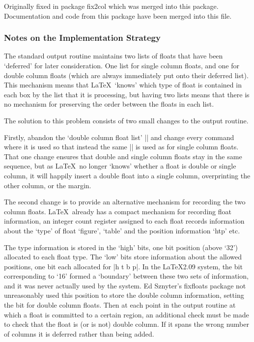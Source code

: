 \documentclass{ltxguide}
\newcommand\Lpack[1]{\mbox{\textsf{#1}}}
\begin{document}
Originally fixed in package \Lpack{fix2col} which was merged into
this package. Documentation and code from this package have been
merged into this file.

\subsubsection{Notes on the Implementation Strategy}

The standard output routine maintains two lists of floats that have
been `deferred' for later consideration. One list for single column
floats, and one for double column floats (which are always
immediately put onto their deferred list). This mechanism means
that \LaTeX\ `knows' which type of float is contained in each box
by the list that it is processing, but having two lists means
that there is no mechanism for preserving the order between the
floats in each list.

The solution to this problem consists of two small changes to
the output routine.

Firstly, abandon the `double column float list' |\@dbldeferlist|
and change every command where it is used so that instead the
same |\@deferlist| is used as for single column floats.
That one change ensures that double and single column floats
stay in the same sequence, but as \LaTeX\ no longer `knows'
whether a float is double or single column, it will happily
insert a double float into a single column, overprinting the
other column, or the margin.

The second change is to provide an alternative mechanism for
recording the two column floats. \LaTeX\ already has a compact
mechanism for recording float information, an integer count register
assigned to each float records information about the `type' of float
`figure', `table' and the position information `htp' etc.

The type information is stored in the `high' bits, one bit position
(above `32') allocated to each float type. The `low' bits store
information about the allowed positions, one bit each allocated for
|h t b p|.  In the \LaTeX2.09 system, the bit corresponding to `16'
formed a `boundary' between these two sets of information, and it
was never actually used by the system. Ed Sznyter's
\Lpack{fixfloats} package not unreasonably used this position to
store the double column information, setting the bit for double
column floats. Then at each point in the output routine at which a
float is committed to a certain region, an additional check must be
made to check that the float is (or is not) double column. If it
spans the wrong number of columns it is deferred rather than being
added.
\end{document}
